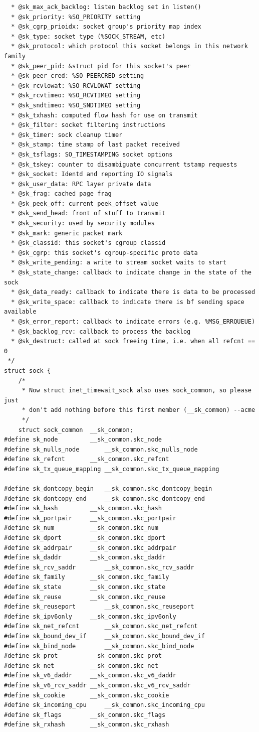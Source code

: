 \documentclass[11pt, a4paper,oneside]{book}
\theoremstyle{ocrenumbox}
\theoremstyle{purplenumbox}
\theoremstyle{blackbox}
\begin{document}
\begin{verbatim}
  *	@sk_max_ack_backlog: listen backlog set in listen()
  *	@sk_priority: %SO_PRIORITY setting
  *	@sk_cgrp_prioidx: socket group's priority map index
  *	@sk_type: socket type (%SOCK_STREAM, etc)
  *	@sk_protocol: which protocol this socket belongs in this network family
  *	@sk_peer_pid: &struct pid for this socket's peer
  *	@sk_peer_cred: %SO_PEERCRED setting
  *	@sk_rcvlowat: %SO_RCVLOWAT setting
  *	@sk_rcvtimeo: %SO_RCVTIMEO setting
  *	@sk_sndtimeo: %SO_SNDTIMEO setting
  *	@sk_txhash: computed flow hash for use on transmit
  *	@sk_filter: socket filtering instructions
  *	@sk_timer: sock cleanup timer
  *	@sk_stamp: time stamp of last packet received
  *	@sk_tsflags: SO_TIMESTAMPING socket options
  *	@sk_tskey: counter to disambiguate concurrent tstamp requests
  *	@sk_socket: Identd and reporting IO signals
  *	@sk_user_data: RPC layer private data
  *	@sk_frag: cached page frag
  *	@sk_peek_off: current peek_offset value
  *	@sk_send_head: front of stuff to transmit
  *	@sk_security: used by security modules
  *	@sk_mark: generic packet mark
  *	@sk_classid: this socket's cgroup classid
  *	@sk_cgrp: this socket's cgroup-specific proto data
  *	@sk_write_pending: a write to stream socket waits to start
  *	@sk_state_change: callback to indicate change in the state of the sock
  *	@sk_data_ready: callback to indicate there is data to be processed
  *	@sk_write_space: callback to indicate there is bf sending space available
  *	@sk_error_report: callback to indicate errors (e.g. %MSG_ERRQUEUE)
  *	@sk_backlog_rcv: callback to process the backlog
  *	@sk_destruct: called at sock freeing time, i.e. when all refcnt == 0
 */
struct sock {
	/*
	 * Now struct inet_timewait_sock also uses sock_common, so please just
	 * don't add nothing before this first member (__sk_common) --acme
	 */
	struct sock_common	__sk_common;
#define sk_node			__sk_common.skc_node
#define sk_nulls_node		__sk_common.skc_nulls_node
#define sk_refcnt		__sk_common.skc_refcnt
#define sk_tx_queue_mapping	__sk_common.skc_tx_queue_mapping

#define sk_dontcopy_begin	__sk_common.skc_dontcopy_begin
#define sk_dontcopy_end		__sk_common.skc_dontcopy_end
#define sk_hash			__sk_common.skc_hash
#define sk_portpair		__sk_common.skc_portpair
#define sk_num			__sk_common.skc_num
#define sk_dport		__sk_common.skc_dport
#define sk_addrpair		__sk_common.skc_addrpair
#define sk_daddr		__sk_common.skc_daddr
#define sk_rcv_saddr		__sk_common.skc_rcv_saddr
#define sk_family		__sk_common.skc_family
#define sk_state		__sk_common.skc_state
#define sk_reuse		__sk_common.skc_reuse
#define sk_reuseport		__sk_common.skc_reuseport
#define sk_ipv6only		__sk_common.skc_ipv6only
#define sk_net_refcnt		__sk_common.skc_net_refcnt
#define sk_bound_dev_if		__sk_common.skc_bound_dev_if
#define sk_bind_node		__sk_common.skc_bind_node
#define sk_prot			__sk_common.skc_prot
#define sk_net			__sk_common.skc_net
#define sk_v6_daddr		__sk_common.skc_v6_daddr
#define sk_v6_rcv_saddr	__sk_common.skc_v6_rcv_saddr
#define sk_cookie		__sk_common.skc_cookie
#define sk_incoming_cpu		__sk_common.skc_incoming_cpu
#define sk_flags		__sk_common.skc_flags
#define sk_rxhash		__sk_common.skc_rxhash


\end{verbatim}
\end{document}
